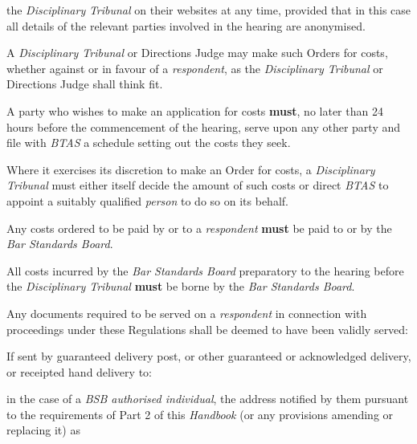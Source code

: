 the \emph{Disciplinary} \emph{Tribunal} on their websites at any time,
provided that in this case all details of the relevant parties involved
in the hearing are anonymised.\ln
{}\par
{}
A \emph{Disciplinary Tribunal} or Directions Judge may make such Orders
for costs, whether against or in favour of a \emph{respondent}, as
the \emph{Disciplinary Tribunal} or Directions Judge shall think fit.\\
\par
A party who wishes to make an application for costs  \textcolor{myred}{\textbf{must}}, no later than
24 hours before the commencement of the hearing, serve upon any other
party and file with \emph{BTAS }a schedule setting out the costs they
seek.\\
\par
Where it exercises its discretion to make an Order for costs,
a \emph{Disciplinary Tribunal }must either itself decide the amount of
such costs or direct \emph{BTAS }to appoint a suitably
qualified \emph{person }to do so on its behalf.\\
\par
Any costs ordered to be paid by or to a \emph{respondent}  \textcolor{myred}{\textbf{must}} be paid
to or by the \emph{Bar Standards Board}.\\
\par
All costs incurred by the \emph{Bar Standards Board} preparatory to the
hearing before the \emph{Disciplinary Tribunal}  \textcolor{myred}{\textbf{must}} be borne by
the \emph{Bar Standards Board}.\\
\par
{}
Any documents required to be served on a \emph{respondent} in connection
with proceedings under these Regulations shall be deemed to have been
validly served:\\\nl \item If sent by guaranteed delivery post, or other guaranteed or
acknowledged delivery, or receipted hand delivery to:\\\al
\item in the case of a \emph{BSB authorised individual}, the address
notified by them pursuant to the requirements of Part 2 of
this \emph{Handbook} (or any provisions amending or replacing it) as
